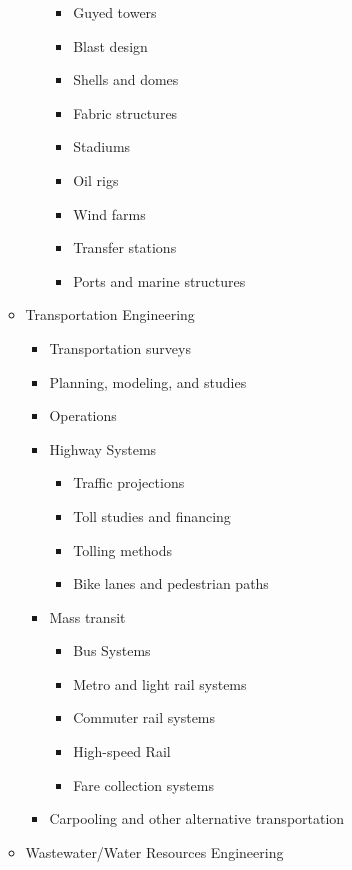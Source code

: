 \documentclass{article}
\begin{document}
\begin{itemize}
\begin{itemize}
\begin{itemize}
\begin{itemize}
                \item Guyed towers
                \item Blast design
                \item Shells and domes
                \item Fabric structures
                \item Stadiums
                \item Oil rigs
                \item Wind farms
                \item Transfer stations
                \item Ports and marine structures
            \end{itemize}
        \end{itemize}
        \item Transportation Engineering
        \begin{itemize}
            \item Transportation surveys
            \item Planning, modeling, and studies
            \item Operations
            \item Highway Systems
            \begin{itemize}
                \item Traffic projections
                \item Toll studies and financing
                \item Tolling methods
                \item Bike lanes and pedestrian paths
            \end{itemize}
            \item Mass transit
            \begin{itemize}
                \item Bus Systems
                \item Metro and light rail systems
                \item Commuter rail systems
                \item High-speed Rail
                \item Fare collection systems
            \end{itemize}
            \item Carpooling and other alternative transportation
        \end{itemize}
        \item Wastewater/Water Resources Engineering

\end{itemize}
\end{itemize}
\end{document}
